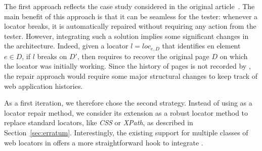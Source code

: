 The first approach reflects the case study considered in the original \erratum article~\cite{brisset2021erratum}.
The main benefit of this approach is that it can be seamless for the tester: whenever a locator breaks, it is automatically repaired without requiring any action from the tester.
However, integrating such a solution implies some significant changes in the \cerberus architecture.
Indeed, given a locator $l = loc_{e,D}$ that identifies en element $e \in D$, if $l$ breaks on $D'$, then \erratum requires to recover the original page $D$ on which the locator was initially working.
Since the history of pages is not recorded by \cerberus, the repair approach would require some major structural changes to keep track of web application histories.

As a first iteration, we therefore chose the second strategy.
Instead of using \erratum as a locator repair method, we consider its extension as a robust locator method to replace standard locators, like \textit{CSS} or \textit{XPath}, as described in Section~\ref{sec:erratum}.
Interestingly, the existing support for multiple classes of web locators in \cerberus offers a more straightforward hook to integrate \erratum.

